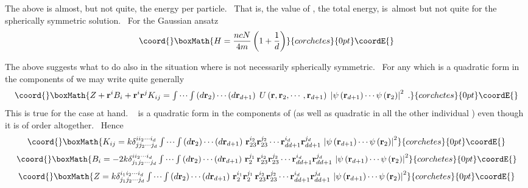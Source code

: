 \documentclass[a4paper,12pt]{article}%
\begin{document}
The \coordHE{} above is almost, but not quite, the energy per particle. \ That is,
the value of \coordHE{}, the total energy, is\ almost but not quite \coordHE{} for the
spherically symmetric solution. \ For the Gaussian ansatz%
\[\coord{}\boxMath{
H=\frac{ncN}{4m}\left(  1+\frac{1}{d}\right)
}{corchetes}{0pt}\coordE{}\]

The above suggests what to do also in the situation where \myHighlight{$\psi$}\coordHE{} is not
necessarily spherically symmetric. \ For any \coordHE{}
which is a quadratic form in the components of \coordHE{} we may write quite
generally
\[\coord{}\boxMath{
Z+\mathbf{r}^{i}B_{i}+\mathbf{r}^{i}\mathbf{r}^{j}K_{ij}=%
{\textstyle\idotsint}
\left(  d\mathbf{r}_{2}\right)  \cdots\left(  d\mathbf{r}_{d+1}\right)
\;U\left(  \mathbf{r},\mathbf{r}_{2},\cdots,\mathbf{r}_{d+1}\right)  \;\left|
\psi\left(  \mathbf{r}_{d+1}\right)  \cdots\psi\left(  \mathbf{r}_{2}\right)
\right|  ^{2}\;.
}{corchetes}{0pt}\coordE{}\]
This is true for the case at hand. \ \coordHE{} is a
quadratic form in the components of \coordHE{} (as well as quadratic in all
the other individual \coordHE{}) even though it is of order \coordHE{}
altogether. \ Hence
\[\coord{}\boxMath{
K_{ij}=k\delta_{jj_{2}\cdots j_{d}}^{ii_{2}\cdots i_{d}}\,%
{\textstyle\idotsint}
\left(  d\mathbf{r}_{2}\right)  \cdots\left(  d\mathbf{r}_{d+1}\right)
\,\mathbf{r}_{23}^{i_{2}}\mathbf{r}_{23}^{j_{2}}\cdots\mathbf{r}_{dd+1}%
^{i_{d}}\mathbf{r}_{dd+1}^{j_{d}}\,\left|  \psi\left(  \mathbf{r}%
_{d+1}\right)  \cdots\psi\left(  \mathbf{r}_{2}\right)  \right|  ^{2}%
}{corchetes}{0pt}\coordE{}\]%
\[\coord{}\boxMath{
B_{i}=-2k\delta_{j_{1}j_{2}\cdots j_{d}}^{ii_{2}\cdots i_{d}}\,%
{\textstyle\idotsint}
\left(  d\mathbf{r}_{2}\right)  \cdots\left(  d\mathbf{r}_{d+1}\right)
\,\mathbf{r}_{2}^{j_{1}}\,\mathbf{r}_{23}^{i_{2}}\mathbf{r}_{23}^{j_{2}}%
\cdots\mathbf{r}_{dd+1}^{i_{d}}\mathbf{r}_{dd+1}^{j_{d}}\,\left|  \psi\left(
\mathbf{r}_{d+1}\right)  \cdots\psi\left(  \mathbf{r}_{2}\right)  \right|
^{2}%
}{corchetes}{0pt}\coordE{}\]%
\[\coord{}\boxMath{
Z=k\delta_{j_{1}j_{2}\cdots j_{d}}^{i_{1}i_{2}\cdots i_{d}}\,%
{\textstyle\idotsint}
\left(  d\mathbf{r}_{2}\right)  \cdots\left(  d\mathbf{r}_{d+1}\right)
\,\mathbf{r}_{2}^{i_{1}}\mathbf{r}_{2}^{j_{1}}\,\mathbf{r}_{23}^{i_{2}%
}\mathbf{r}_{23}^{j_{2}}\cdots\mathbf{r}_{dd+1}^{i_{d}}\mathbf{r}%
_{dd+1}^{j_{d}}\,\left|  \psi\left(  \mathbf{r}_{d+1}\right)  \cdots
\psi\left(  \mathbf{r}_{2}\right)  \right|  ^{2}%
}{corchetes}{0pt}\coordE{}\]
\end{document}
